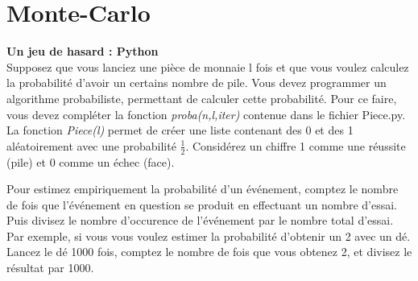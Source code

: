 \section{Monte-Carlo}
\begin{Exercice}[10 minutes]\textbf{Un jeu de hasard : Python}\\
Supposez que vous lanciez une pièce de monnaie l fois et que vous voulez calculez la probabilité d'avoir un certains nombre de pile. Vous devez programmer un algorithme probabiliste, permettant de calculer cette probabilité. Pour ce faire, vous devez compléter la fonction \textit{proba(n,l,iter)} contenue dans le fichier Piece.py. La fonction \textit{Piece(l)} permet de créer une liste contenant des 0 et des 1 aléatoirement avec une probabilité $\frac{1}{2}$. Considérez un chiffre 1 comme une réussite (pile) et 0 comme un échec (face).
\\
\begin{conseil}
    Pour estimez empiriquement la probabilité d'un événement, comptez le nombre de fois que l'événement en question se produit en effectuant un nombre d'essai. Puis divisez le nombre d'occurence de l'événement par le nombre total d'essai. Par exemple, si vous vous voulez estimer la probabilité d'obtenir un 2 avec un dé. Lancez le dé 1000 fois, comptez le nombre de fois que vous obtenez 2, et divisez le résultat par 1000.
\end{conseil}
\begin{solution}
    
\end{solution}
\end{Exercice}
\newpage
